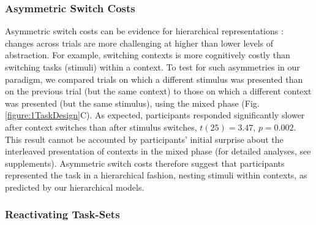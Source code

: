 \documentclass[10pt,letterpaper]{article}  %
\newcommand{\rev}{\color{black}}
\begin{document}
\subsubsection*{Asymmetric Switch Costs}
Asymmetric switch costs can be evidence for hierarchical representations \cite{monsell_task_2003, collins_human_2014}: changes across trials are more challenging at higher than lower levels of abstraction. For example, switching contexts is more cognitively costly than switching tasks (stimuli) within a context.
To test for such asymmetries in our paradigm, we compared trials on which a different stimulus was presented than on the previous trial (but the same context) to those on which a different context was presented (but the same stimulus), using the mixed phase (Fig. \ref{figure:1TaskDesign}C).
As expected, participants responded significantly slower after context switches than after stimulus switches, $t(25)=3.47$, $p=0.002$. {\rev This result cannot be accounted by participants' initial surprise about the interleaved presentation of contexts in the mixed phase (for detailed analyses, see supplements)}. 
Asymmetric switch costs therefore suggest that participants represented the task in a hierarchical fashion, nesting stimuli within contexts, as predicted by our hierarchical models.

\subsubsection*{Reactivating Task-Sets}
\end{document}
